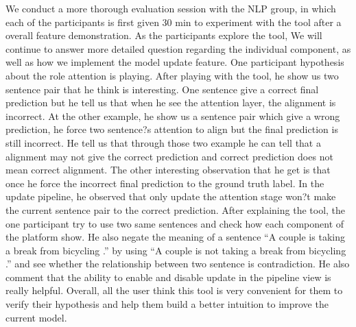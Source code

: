 We conduct a more thorough evaluation session with the NLP group, in which each of the participants is first given 30 min to experiment with the tool after a overall feature demonstration. As the participants explore the tool, 
We will continue to answer more detailed question regarding the individual component, as well as how we implement the model update feature.
%
One participant hypothesis about the role attention is playing. After playing with the tool, he show us two sentence pair that he think is interesting. One sentence give a correct final prediction but he tell us that when he see the attention layer, the alignment is incorrect. At the other example, he show us a sentence pair which give a wrong prediction, he force two sentence?s attention to align but the final prediction is still incorrect. He tell us that through those two example  he can tell that a alignment may not give the correct prediction and correct prediction does not mean correct alignment. 
%
The other interesting observation that he get is that once he force the incorrect final prediction to the ground truth label. In the update pipeline,  he observed that only update the attention stage won?t make the current sentence pair to the correct prediction. 
%
After explaining the tool, the one participant try to use two same sentences and check how each component of the platform show. He also negate the meaning of a sentence ``A couple is taking a break from bicycling .''  by using ``A couple is not taking a break from bicycling .'' and see whether the relationship between two sentence is contradiction. He also comment that the ability to enable and disable update in the pipeline view is really helpful.
%
Overall, all the user think this tool is very convenient for them to verify their hypothesis and help them build a better intuition to improve the current model.


